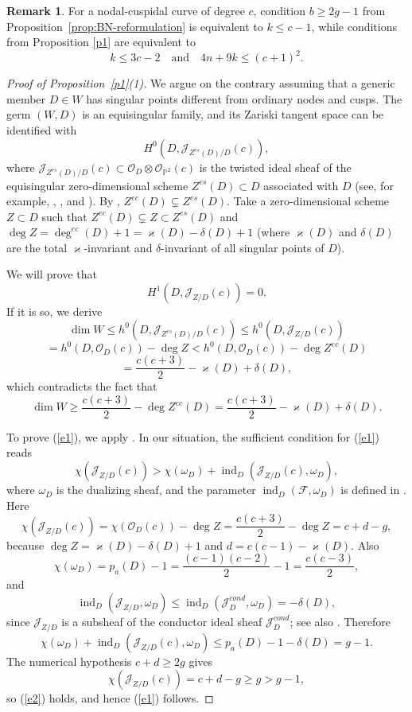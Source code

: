 \documentclass[11pt]{amsart}
\theoremstyle{definition}
\newtheorem{remark}[lemma]{Remark}
\theoremstyle{remark}
\newcommand{\PP}{{\mathbb P}}
\DeclareMathOperator{\ind}{ind}\DeclareMathOperator{\Ext}{Ext}
\begin{document}
\begin{remark}\label{r1}
For a nodal-cuspidal curve of degree $c$, condition $b\ge2g-1$ from Proposition~\ref{prop:BN-reformulation} is equivalent to $k\le c-1$, while conditions from Proposition \ref{p1} are equivalent to
$$k\le3c-2\quad\text{and}\quad 4n+9k\le(c+1)^2.$$
\end{remark}

\begin{proof}[Proof of Proposition~\ref{p1}(1)]
We argue on the contrary assuming that a generic member $D\in W$ has singular points different from ordinary nodes and cusps. The germ $(W,D)$ is an equisingular family, and its Zariski tangent space can be identified with $$H^0(D,{\mathcal J}_{Z^{es}(D)/D}(c)),$$
where ${\mathcal J}_{Z^{es}(D)/D}(c)\subset{\mathcal O}_D\otimes{\mathcal O}_{\PP^2}(c)$ is the twisted ideal sheaf of the equisingular zero-dimensional scheme $Z^{es}(D)\subset D$ associated with $D$ (see, for example, \cite[Section 2.1]{GK}, \cite[Section 2.2.2]{GLS1}, and \cite[Section 2.2.1.2]{GLS2}). By \cite[Lemma~14]{Sh24}, $Z^{ec}(D)\subsetneq Z^{es}(D)$. Take a zero-dimensional scheme $Z\subset D$ such that $Z^{ec}(D)\subsetneq Z\subset Z^{es}(D)$ and $\deg Z=\deg^{ec}(D)+1=\varkappa(D)-\delta(D)+1$ (where $\varkappa(D)$ and $\delta(D)$ are the total $\varkappa$-invariant and $\delta$-invariant of all singular points of $D$).

We will prove that
\begin{equation}H^1(D,{\mathcal J}_{Z/D}(c))=0.\label{e1}\end{equation}
If it is so, we derive
$$\dim W\le h^0(D,{\mathcal J}_{Z^{es}(D)/D}(c))\le
h^0(D,{\mathcal J}_{Z/D}(c))$$
$$=h^0(D,{\mathcal O}_D(c))-\deg Z<h^0(D,{\mathcal O}_D(c))-\deg Z^{ec}(D)$$
$$=\frac{c(c+3)}{2}-\varkappa(D)+\delta(D),$$
which contradicts the fact that
$$\dim W\ge\frac{c(c+3)}{2}-\deg Z^{ec}(D)=\frac{c(c+3)}{2}-\varkappa(D)+\delta(D).$$

To prove (\ref{e1}), we apply \cite[Proposition 5.2(i)]{GK}. In our situation, the sufficient condition for (\ref{e1}) reads
\begin{equation}\chi({\mathcal J}_{Z/D}(c))>\chi(\omega_D)+\ind_D({\mathcal J}_{Z/D}(c),\omega_D),\label{e2}\end{equation}
where $\omega_D$ is the dualizing sheaf, and the parameter $\ind_D({\mathcal F},\omega_D)$ is defined in \cite[Section 5.1]{GK}. Here
\[
\chi({\mathcal J}_{Z/D}(c))=\chi({\mathcal O}_D(c))-\deg Z
=\frac{c(c+3)}{2}-\deg Z=c+d-g,
\]
because $\deg Z=\varkappa(D)-\delta(D)+1$ and $d=c(c-1)-\varkappa(D)$. Also
\[
\chi(\omega_D)=p_a(D)-1=\frac{(c-1)(c-2)}2-1=\frac{c(c-3)}2,
\]
and
\[
\ind_D({\mathcal J}_{Z/D},\omega_D)
\le\ind_D({\mathcal J}^{cond}_D,\omega_D)=-\delta(D),
\]
since ${\mathcal J}_{Z/D}$ is a subsheaf of the conductor ideal sheaf ${\mathcal J}^{cond}_D$; see also \cite[Example in Section 5.1]{GK}. Therefore
\[
\chi(\omega_D)+\ind_D({\mathcal J}_{Z/D}(c),\omega_D)
\le p_a(D)-1-\delta(D)=g-1.
\]
The numerical hypothesis $c+d\ge2g$ gives
\[
\chi({\mathcal J}_{Z/D}(c))=c+d-g\ge g>g-1,
\]
so (\ref{e2}) holds, and hence (\ref{e1}) follows.
\end{proof}
\end{document}
